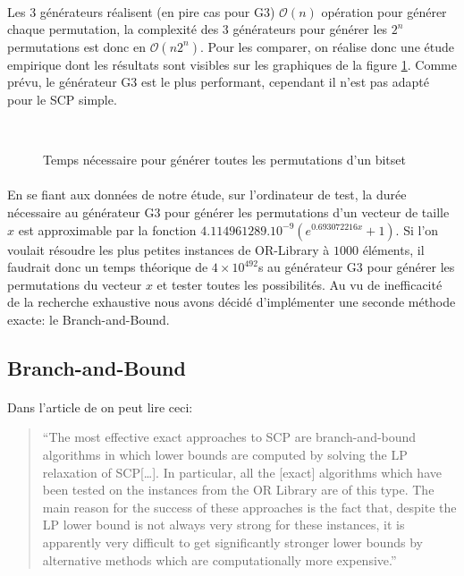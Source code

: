 \documentclass[12pt,letterpaper,twoside]{article}
\begin{document}
			\paragraph*{}
				Les 3 générateurs réalisent (en pire cas pour G3) \(\mathcal{O}(n)\) opération pour générer chaque permutation, la complexité des 3 générateurs pour générer les \(2^n\) permutations est donc en \(\mathcal{O}(n2^n)\). Pour les comparer, on réalise donc une étude empirique dont les résultats sont visibles sur les graphiques de la figure \ref{figure:plots/permutations_generators_time}. Comme prévu, le générateur G3 est le plus performant, cependant il n'est pas adapté pour le SCP simple.
			\begin{figure}[H]
				\centering
				\\
				\caption{Temps nécessaire pour générer toutes les permutations d'un bitset}
				\label{figure:plots/permutations_generators_time}
			\end{figure}
			\paragraph*{}
				En se fiant aux données de notre étude, sur l'ordinateur de test, la durée nécessaire au générateur G3 pour générer les permutations d'un vecteur de taille \(x\) est approximable par la fonction \(4.114961289.10^{-9}\left(e^{0.693072216x} + 1\right)\). Si l'on voulait résoudre les plus petites instances de OR-Library à \(1000\) éléments, il faudrait donc un temps théorique de \(4 \times 10^{492}\)s au générateur G3 pour générer les permutations du vecteur \(x\) et tester toutes les possibilités. Au vu de inefficacité de la recherche exhaustive nous avons décidé d'implémenter une seconde méthode exacte: le Branch-and-Bound.
		\subsection{Branch-and-Bound}\label{sec:bnb}
			\paragraph*{}
				Dans l'article  de \citeauthor{caprara2000algorithms} on peut lire ceci:
				\begin{quote}
					``The most effective exact approaches to SCP are branch-and-bound algorithms in which lower bounds are computed by solving the LP relaxation of SCP[\ldots]. In particular, all the [exact] algorithms which have been tested on the instances from the OR Library are of this type. The main reason for the success of these approaches is the fact that, despite the LP lower bound is not always very strong for these instances, it is apparently very difficult to get significantly stronger lower bounds by alternative methods which are computationally more expensive.''~\cite{caprara2000algorithms}
				\end{quote}
\end{document}
